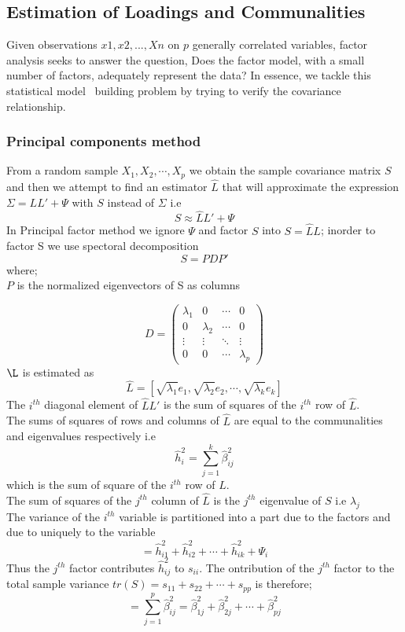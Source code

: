 \documentclass[12]{article}
\begin{document}
\subsection{Estimation of Loadings and Communalities}
Given observations $x1 , x2, ... ,Xn$ on $p$ generally correlated variables, factor analysis seeks to answer the question, Does the factor model, with a small number of factors, adequately represent the data? In essence, we tackle this statistical model~­
building problem by trying to verify the covariance relationship.
\subsubsection{Principal components method}
From a random sample $X_1, X_2, \cdots, X_p$ we obtain the sample covariance matrix $S$ and then we attempt to find an estimator $\hat{L}$ that will approximate the expression $\Sigma=LL' +\Psi$ with $S$ instead of $\Sigma$ i.e
$$S \approx \hat{L}L' + \Psi$$
In Principal factor method we ignore $\Psi$ and factor $S$ into $S=\hat{L}L$; inorder to factor S we use spectoral decomposition $$S=PDP'$$  where;\\
$P$ is the normalized eigenvectors of S as columns

$$D=  \begin{pmatrix}
	\lambda_{1} & 0 & \cdots & 0 \\
	0 & \lambda_{2} & \cdots & 0 \\
	\vdots & \vdots & \ddots & \vdots \\
	0 & 0 & \cdots & \lambda_{p}
\end{pmatrix}$$
$\L$ is estimated as
$$\hat{L}=[\sqrt{\lambda_1}e_1, \sqrt{\lambda_2}e_2, \cdots , \sqrt{\lambda_k}e_k]$$
The $i^{th}$ diagonal element of $\hat{L}L'$ is the sum of squares of the $i^{th}$ row of $\hat{L}$.\\

\noindent The sums of squares of rows and columns of $\hat{L}$ are equal to the communalities and eigenvalues respectively i.e 
$$\hat{h}_i^2 =\sum_{j=1}^{k}\hat{\beta}_{ij}^2$$ which is the sum of square of the $i^{th}$ row of $\hat{L}$.\\
The sum of squares of the $j^{th}$ column of $\hat{L}$ is the $j^{th}$ eigenvalue of $S$ i.e $\lambda_j$\\

\noindent The variance of the $i^{th}$ variable is partitioned into a part due to the factors and due to uniquely to the variable
$$= \hat{h}^2_{i1}+ \hat{h}^2_{i2} + \cdots +\hat{h}^2_{ik} + \Psi_i$$
Thus the $j^{th}$ factor contributes $\hat{h}_{ij}^2$ to $s_{ii}$. The ontribution of the $j^{th}$ factor to the total sample variance $tr(S)=s_{11}+s_{22} +\cdots +s_{pp}$ is therefore; 
$$=\sum_{j=1}^{p}\hat{\beta}_{ij}^2= \hat{\beta}^2_{1j}+ \hat{\beta}^2_{2j}+ \cdots+\hat{\beta}^2_{pj}$$
\end{document}

